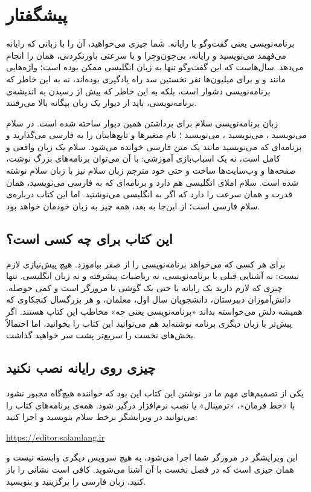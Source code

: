 \chapter*{پیشگفتار}

برنامه‌نویسی یعنی گفت‌وگو با رایانه. شما چیزی می‌خواهید، آن را با زبانی
که رایانه می‌فهمد می‌نویسید و رایانه، بی‌چون‌وچرا و با سرعتی باورنکردنی،
همان را انجام می‌دهد. سال‌هاست که این گفت‌وگو تنها به زبان انگلیسی ممکن
بوده است؛ واژه‌هایی مانند  و  و  برای
میلیون‌ها نفر نخستین سد راه یادگیری بوده‌اند، نه به این خاطر که
برنامه‌نویسی دشوار است، بلکه به این خاطر که پیش از رسیدن به اندیشه‌ی
برنامه‌نویسی، باید از دیوار یک زبان بیگانه بالا می‌رفتند.

زبان برنامه‌نویسی سلام برای برداشتن همین دیوار ساخته شده است. در سلام
می‌نویسید ، می‌نویسید ، می‌نویسید ؛ نام
متغیرها و تابع‌هایتان را به فارسی می‌گذارید و برنامه‌ای که می‌نویسید مانند
یک متن فارسی خوانده می‌شود. سلام یک زبان واقعی و کامل است، نه یک اسباب‌بازی
آموزشی: با آن می‌توان برنامه‌های بزرگ نوشت، صفحه‌ها و وب‌سایت‌ها ساخت و
حتی خود مترجم زبان سلام نیز با زبان سلام نوشته شده است. سلام املای انگلیسی
هم دارد و برنامه‌ای که به فارسی می‌نویسید، همان قدرت و همان سرعت را
دارد که اگر به انگلیسی می‌نوشتید. اما این کتاب درباره‌ی سلام فارسی است؛ از
این‌جا به بعد، همه چیز به زبان خودمان خواهد بود.

\section*{این کتاب برای چه کسی است؟}

برای هر کسی که می‌خواهد برنامه‌نویسی را از صفر بیاموزد. هیچ پیش‌نیازی لازم
نیست: نه آشنایی قبلی با برنامه‌نویسی، نه ریاضیات پیشرفته و نه زبان
انگلیسی. تنها چیزی که لازم دارید یک رایانه یا حتی یک گوشی با مرورگر است و
کمی حوصله. دانش‌آموزان دبیرستان، دانشجویان سال اول، معلمان، و هر بزرگسال
کنجکاوی که همیشه دلش می‌خواسته بداند «برنامه‌نویسی یعنی چه» مخاطب این کتاب
هستند. اگر پیش‌تر با زبان دیگری برنامه نوشته‌اید هم می‌توانید این کتاب را
بخوانید، اما احتمالاً بخش‌های نخست را سریع‌تر پشت سر خواهید گذاشت.

\section*{چیزی روی رایانه نصب نکنید}

یکی از تصمیم‌های مهم ما در نوشتن این کتاب این بود که خواننده هیچ‌گاه مجبور
نشود با «خط فرمان»، «ترمینال» یا نصب نرم‌افزار درگیر شود. همه‌ی برنامه‌های
کتاب را می‌توانید در ویرایشگر برخط سلام بنویسید و اجرا کنید:
\begin{center}
\url{https://editor.salamlang.ir}
\end{center}
این ویرایشگر در مرورگر شما اجرا می‌شود، به هیچ سرویس دیگری وابسته نیست و
همان چیزی است که در فصل نخست با آن آشنا می‌شوید. کافی است نشانی را باز
کنید، زبان فارسی را برگزینید و بنویسید.

